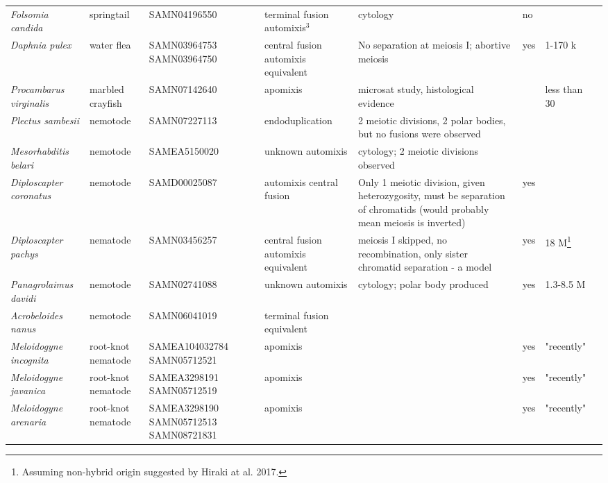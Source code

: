\documentclass{article}
\begin{document}
\begin{longtable}[H]{ C{.13\textwidth} C{.1\textwidth} C{.12\textwidth} L{.15\textwidth} L{.179\textwidth} C{.04\textwidth} C{.082\textwidth} C{.062\textwidth}}
      \textit{Folsomia candida} & springtail & SAMN04196550 & terminal fusion automixis$^3$ & cytology & no & & \cite{Riparbelli2006} \\
      \textit{Daphnia pulex} & water flea & SAMN03964753 SAMN03964750 & central fusion automixis equivalent & No separation at meiosis I; abortive meiosis & yes & 1-170 k & \cite{Hiruta2010} \\
      \textit{Procambarus virginalis} & marbled crayfish & SAMN07142640 & apomixis & microsat study, histological evidence &  & less than 30 & \cite{Vogt2004,Martin2015,Vogt2015} \\
      \hline
      \textit{Plectus sambesii} & nemotode & SAMN07227113 & endoduplication & 2 meiotic divisions, 2 polar bodies, but no fusions were observed &  & & \cite{Lahl2006} \\
      \textit{Mesorhabditis belari} & nemotode & SAMEA5150020 & unknown automixis & cytology; 2 meiotic divisions observed &  &  & \cite{grosmaire2019} \\
      \textit{Diploscapter coronatus} & nemotode & SAMD00025087 & automixis central fusion & Only 1 meiotic division, given heterozygosity, must be separation of chromatids (would probably mean meiosis is inverted) & yes & & \cite{Lahl2006,Hiraki2017} \\
      \textit{Diploscapter pachys} & nematode & SAMN03456257 & central fusion automixis equivalent & meiosis I skipped, no recombination, only sister chromatid separation - a model & yes & 18 M\footnote{Assuming non-hybrid origin suggested by Hiraki at al. 2017.} & \cite{Fradin2017} \\
      \textit{Panagrolaimus davidi} & nemotode & SAMN02741088 & unknown automixis & cytology; polar body produced & yes & 1.3-8.5 M & \cite{Schiffer2017} \\
      \textit{Acrobeloides nanus} & nemotode & SAMN06041019 & terminal fusion equivalent & & & & \cite{Lahl2006} \\
      \textit{Meloidogyne incognita} & root-knot nematode & SAMEA104032784 SAMN05712521 & apomixis & & yes & "recently" & \cite{Triantaphyllou1981, VanderBeek1998, Lunt2014} \\
      \textit{Meloidogyne javanica} & root-knot nematode & SAMEA3298191 SAMN05712519 & apomixis & & yes & "recently" & \cite{Lunt2014} \\
      \textit{Meloidogyne arenaria} & root-knot nematode & SAMEA3298190 SAMN05712513 SAMN08721831 & apomixis & & yes & "recently" & \cite{Lunt2014} \\

\end{longtable}
\end{document}
